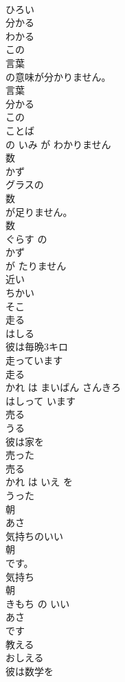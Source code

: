 \documentclass[8pt]{extreport}
\begin{document}
\begin{CJK}{UTF8}{min}
\\	ひろい
\\	分かる	
\\	わかる	
\\	この
\\	言葉
\\	の意味が分かりません。	
\\	言葉 
\\	分かる 
\\	この 
\\	ことば
\\	の いみ が わかりません	
\\	数	
\\	かず	
\\	グラスの
\\	数
\\	が足りません。	
\\	数 
\\	ぐらす の 
\\	かず
\\	が たりません	
\\	近い	
\\	ちかい	
\\	そこ	
\\	走る	
\\	はしる	
\\	彼は毎晩3キロ
\\	走っています
\\	走る 
\\	かれ は まいばん さんきろ 
\\	はしって います
\\	売る	
\\	うる	
\\	彼は家を
\\	売った
\\	売る 
\\	かれ は いえ を 
\\	うった
\\	朝	
\\	あさ	
\\	気持ちのいい
\\	朝
\\	です。	
\\	気持ち 
\\	朝 
\\	きもち の いい 
\\	あさ
\\	です	
\\	教える	
\\	おしえる	
\\	彼は数学を

\end{CJK}
\end{document}

